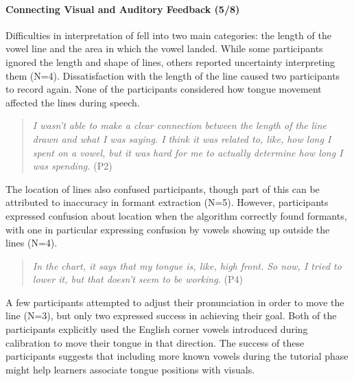 \paragraph{Connecting Visual and Auditory Feedback (5/8)}
Difficulties in interpretation of \visowel{} fell into two main categories: the length of the vowel line and the area in which the vowel landed. While some participants ignored the length and shape of lines, others reported uncertainty interpreting them (N=4). Dissatisfaction with the length of the line caused two participants to record again. None of the participants considered how tongue movement affected the lines during speech. 
\begin{quote}
    \textit{I wasn't able to make a clear connection between the length of the line drawn and what I was saying. I think it was related to, like, how long I spent on a vowel, but it was hard for me to actually determine how long I was spending.} (P2)
\end{quote}
The location of lines also confused participants, though part of this can be attributed to inaccuracy in formant extraction (N=5). However, participants expressed confusion about location when the algorithm correctly found formants, with one in particular expressing confusion by vowels showing up outside the lines (N=4). 
\begin{quote}
   \textit{In the chart, it says that my tongue is, like, high front. So now, I tried to lower it, but that doesn't seem to be working.} (P4)
\end{quote}
A few participants attempted to adjust their pronunciation in order to move the line (N=3), but only two expressed success in achieving their goal. Both of the participants explicitly used the English corner vowels introduced during calibration to move their tongue in that direction. The success of these participants suggests that including more known vowels during the tutorial phase might help learners associate tongue positions with visuals.


